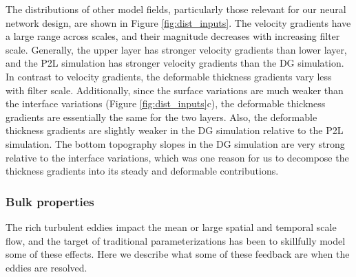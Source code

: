 \documentclass[draft]{agujournal2019}
\begin{document}
The distributions of other model fields, particularly those relevant for our neural network design, are shown in Figure \ref{fig:dist_inputs}. The velocity gradients have a large range across scales, and their magnitude decreases with increasing filter scale. Generally, the upper layer has stronger velocity gradients than lower layer, and the P2L simulation has stronger velocity gradients than the DG simulation. In contrast to velocity gradients, the deformable thickness gradients vary less with filter scale. Additionally, since the surface variations are much weaker than the interface variations (Figure \ref{fig:dist_inputs}c), the deformable thickness gradients are essentially the same for the two layers. Also, the deformable thickness gradients are slightly weaker in the DG simulation relative to the P2L simulation. The bottom topography slopes in the DG simulation are very strong relative to the interface variations, which was one reason for us to decompose the thickness gradients into its steady and deformable contributions.


\subsubsection{Bulk properties}
The rich turbulent eddies impact the mean or large spatial and temporal scale flow, and the target of traditional parameterizations has been to skillfully model some of these effects. Here we describe what some of these feedback are when the eddies are resolved. 
\end{document}
